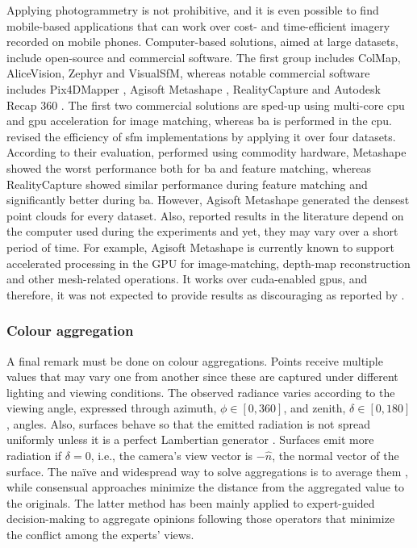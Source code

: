 Applying photogrammetry is not prohibitive, and it is even possible to find mobile-based applications that can work over cost- and time-efficient imagery recorded on mobile phones. Computer-based solutions, aimed at large datasets, include open-source and commercial software. The first group includes ColMap, AliceVision, Zephyr and VisualSfM, whereas notable commercial software includes Pix4DMapper \cite{zheng_thermal_2020}, Agisoft Metashape \cite{grechi_3d_2021}, RealityCapture and Autodesk Recap 360 \cite{lafi_3d_2017}. The first two commercial solutions are sped-up using multi-core \acrshort{cpu} and \acrshort{gpu} acceleration for image matching, whereas \acrshort{ba} is performed in the \acrshort{cpu}. \cite{jiang_efficient_2020} revised the efficiency of \acrshort{sfm} implementations by applying it over four datasets. According to their evaluation, performed using commodity hardware, Metashape showed the worst performance both for \acrshort{ba} and feature matching, whereas RealityCapture showed similar performance during feature matching and significantly better during \acrshort{ba}. However, Agisoft Metashape generated the densest point clouds for every dataset. Also, reported results in the literature depend on the computer used during the experiments and yet, they may vary over a short period of time. For example, Agisoft Metashape is currently known to support accelerated processing in the GPU for image-matching, depth-map reconstruction and other mesh-related operations. It works over \acrshort{cuda}-enabled \acrshort{gpu}s, and therefore, it was not expected to provide results as discouraging as reported by \cite{jiang_efficient_2020}.

\subsubsection{Colour aggregation}

A final remark must be done on colour aggregations. Points receive multiple values that may vary one from another since these are captured under different lighting and viewing conditions. The observed radiance varies according to the viewing angle, expressed through azimuth, $\phi \in [0, 360]$, and zenith, $\delta \in [0, 180]$, angles. Also, surfaces behave so that the emitted radiation is not spread uniformly unless it is a perfect Lambertian generator \cite{vollmer_infrared_2017}. Surfaces emit more radiation if $\delta = 0$, i.e., the camera's view vector is $-\hat{n}$, the normal vector of the surface. The naïve and widespread way to solve aggregations is to average them \cite{javadnejad_photogrammetric_2020, hoegner_3d_2016}, while consensual approaches minimize the distance from the aggregated value to the originals. The latter method has been mainly applied to expert-guided decision-making to aggregate opinions following those operators that minimize the conflict among the experts' views.

